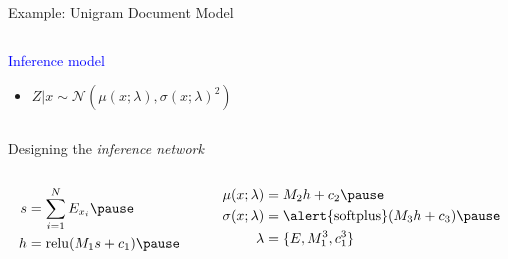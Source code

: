 \documentclass[14pt]{beamer}
\begin{document}
\begin{frame}{Example: Unigram Document Model}


\begin{columns}
	\begin{column}{0.75\textwidth}  
   		\textcolor{blue}{Inference model}
		\begin{itemize}
			\item $Z|x \sim \mathcal N(\mu(x; \lambda), \sigma(x; \lambda)^2)$
		\end{itemize}
    \end{column}
	\begin{column}{0.2\textwidth}
    \end{column}    
    \end{columns}
    \pause
    
    Designing the \emph{inference network}\pause
    \vspace{-10pt}
    \begin{columns}
    \begin{column}{0.35\textwidth}
    \begin{equation*}
	\begin{aligned}		
		s &= \sum_{i=1}^N E_{x_i} \pause \\
		h &= \relu(M_1s+c_1)  \pause 		
	\end{aligned}
	\end{equation*}
	\end{column}
	\begin{column}{0.6\textwidth}
	\begin{equation*}
	\begin{aligned}		
		\mu(x; \lambda) &= M_2h + c_2  \pause \\
		\sigma(x; \lambda) &= \alert{\softplus}(M_3h + c_3)  \pause \\
		\lambda &= \{E, M_1^3, c_1^3\}
	\end{aligned}
	\end{equation*}
	\end{column}
	\end{columns}
	

\end{frame}
\end{document}
